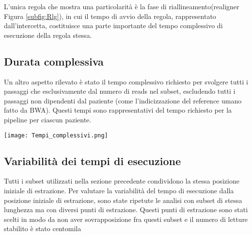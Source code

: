 L'unica regola che mostra una particolarità è la fase di riallineamento(realigner Figura \ref{subfig:Rlg}), in cui il tempo di avvio della regola, rappresentato dall'intercetta, costituisce una parte importante del tempo complessivo di esecuzione della regola stessa. 


\subsection{Durata complessiva}
Un altro aspetto rilevato è stato il tempo complessivo richiesto per svolgere tutti i passaggi che esclusivamente dal numero di reads nel subset, escludendo tutti i passaggi non dipendenti dal paziente (come l'indicizzazione del reference umano fatto da BWA).
Questi tempi sono rappresentativi del tempo richiesto per la pipeline per ciascun paziente. 

\begin{table}[H]
  \begin{minipage}[b]{0.4\linewidth}
	\centering
	\texttt{[image: Tempi\_complessivi.png]}	
	\label{fig:Ttot}
  \end{minipage}
  \hfill  
  \begin{varwidth}[b]{0.4\linewidth}
    \centering
    \caption{Pendenze per i tempi complessivi.}
    \label{tab:Ttot}
  \end{varwidth}%
\end{table}

\subsection{Variabilità dei tempi di esecuzione}
Tutti i subset utilizzati nella sezione precedente condividono la stessa posizione iniziale di estrazione.
Per valutare la variabilità del tempo di esecuzione dalla posizione iniziale di estrazione, sono state ripetute le analisi con subset di stessa lunghezza ma con diversi punti di estrazione.
Questi punti di estrazione sono stati scelti in modo da non aver sovrapposizione fra questi subset e il numero di letture stabilito è stato centomila

